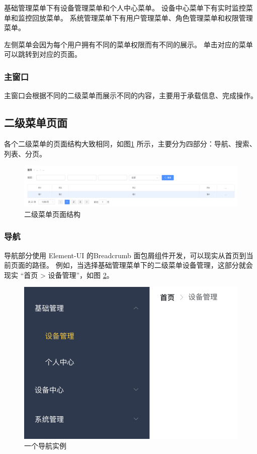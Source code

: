 基础管理菜单下有设备管理菜单和个人中心菜单。
设备中心菜单下有实时监控菜单和监控回放菜单。
系统管理菜单下有用户管理菜单、角色管理菜单和权限管理菜单。

左侧菜单会因为每个用户拥有不同的菜单权限而有不同的展示。
单击对应的菜单可以跳转到对应的页面。

\subsubsection{主窗口}
主窗口会根据不同的二级菜单而展示不同的内容，主要用于承载信息、完成操作。

\subsection{二级菜单页面}
各个二级菜单的页面结构大致相同，如图\ref{Fig:main} 所示，主要分为四部分：导航、搜索、列表、分页。

\begin{figure}[ht]
    \centering
    \includegraphics[width=0.9\linewidth]{./Figure/IMG_main.png}
    \caption{二级菜单页面结构}\label{Fig:main}
\end{figure}

\subsubsection{导航}
导航部分使用 Element-UI 的Breadcrumb 面包屑组件开发，可以现实从首页到当前页面的路径。
例如，当选择基础管理菜单下的二级菜单设备管理，这部分就会现实 “首页 > 设备管理”，如图 \ref{Fig:eg_main}。

\begin{figure}[ht]
    \centering
    \includegraphics[width=0.6\linewidth]{./Figure/IMG_eg_main.png}
    \caption{一个导航实例}\label{Fig:eg_main}
\end{figure}

